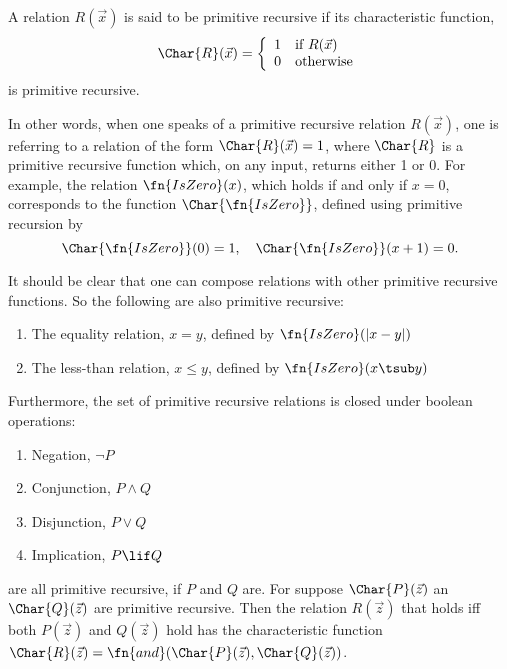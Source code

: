 \documentclass[../../../include/open-logic-section]{subfiles}
\begin{document}


\begin{defn}
A relation $R(\vec x)$ is said to be primitive recursive if its characteristic
function,
\[
\Char{R}(\vec x) = \left\{
  \begin{array}{ll}
  1 & \mbox{if $R(\vec x)$} \\
  0 & \mbox{otherwise}
  \end{array}
\right.
\]
is primitive recursive.
\end{defn}

In other words, when one speaks of a primitive recursive relation
$R(\vec x)$, one is referring to a relation of the form $\Char{R}(\vec
x) = 1$, where $\Char{R}$ is a primitive recursive function which, on
any input, returns either 1 or 0. For example, the relation
$\fn{IsZero}(x)$, which holds if and only if $x = 0$, corresponds to the
function $\Char{\fn{IsZero}}$, defined using primitive recursion by
\[
\Char{\fn{IsZero}}(0) = 1, \quad \Char{\fn{IsZero}}(x+1) = 0.
\]

It should be clear that one can compose relations with other primitive
recursive functions. So the following are also primitive recursive:
\begin{enumerate}
\item The equality relation, $x = y$, defined by $\fn{IsZero}(\left|x -
  y\right|)$
\item The less-than relation, $x \leq y$, defined by $\fn{IsZero}(x
  \tsub y)$
\end{enumerate}
Furthermore, the set of primitive recursive relations is closed under
boolean operations:
\begin{enumerate}
\item Negation, $\lnot P$
\item Conjunction, $P \land Q$
\item Disjunction, $P \lor Q$
\item Implication, $P \lif Q$
\end{enumerate}
are all primitive recursive, if $P$ and $Q$ are. For suppose
$\Char{P}(\vec z)$ an $\Char{Q}(\vec z)$ are primitive recursive. Then
the relation $R(\vec z)$ that holds iff both $P(\vec z)$ and $Q(\vec
z)$ hold has the characteristic function $\Char{R}(\vec z) =
\fn{and}(\Char{P}(\vec z), \Char{Q}(\vec z))$.
\end{document}
